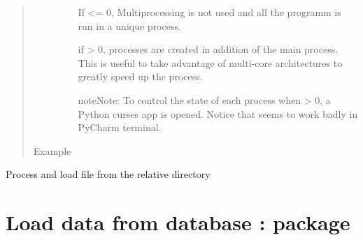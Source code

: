 \documentclass[letterpaper,10pt,english]{sphinxmanual}
\begin{document}
\begin{fulllineitems}
\begin{quote}
\begin{description}
\begin{itemize}
If  \textless{}= 0, Multiprocessing is not used and all the programm is run in a unique process.

if  \textgreater{} 0,  processes are created in addition of the main process. This is useful to take
advantage of multi-core architectures to greatly speed up the process.

\begin{sphinxadmonition}{note}{Note:}
To control the state of each process when  \textgreater{} 0, a Python curses app is opened. Notice that
seems to work badly in PyCharm terminal.
\end{sphinxadmonition}


\end{itemize}

\item[{Example}] \leavevmode
\end{description}\end{quote}

Process and load file from the relative directory 

%
\begin{sphinxVerbatim}[commandchars=\\\{\}]
  \PYG{p}{[}\PYG{p}{]}
      
       
         

\end{sphinxVerbatim}

\end{fulllineitems}



\chapter{Load data from database :  package}
\label{\detokenize{load:load-data-from-database-load-package}}\label{\detokenize{load::doc}}
\end{document}
